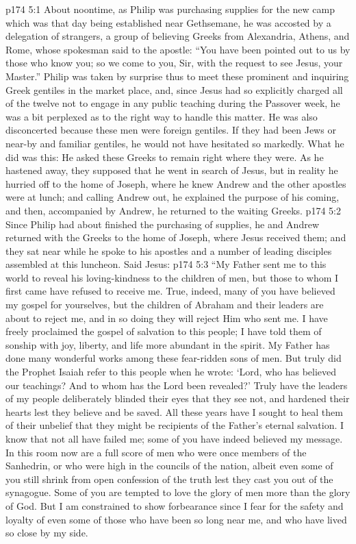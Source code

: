 \vs p174 5:1 About noontime, as Philip was purchasing supplies for the new camp which was that day being established near Gethsemane, he was accosted by a delegation of strangers, a group of believing Greeks from Alexandria, Athens, and Rome, whose spokesman said to the apostle: “You have been pointed out to us by those who know you; so we come to you, Sir, with the request to see Jesus, your Master.” Philip was taken by surprise thus to meet these prominent and inquiring Greek gentiles in the market place, and, since Jesus had so explicitly charged all of the twelve not to engage in any public teaching during the Passover week, he was a bit perplexed as to the right way to handle this matter. He was also disconcerted because these men were foreign gentiles. If they had been Jews or near\hyp{}by and familiar gentiles, he would not have hesitated so markedly. What he did was this: He asked these Greeks to remain right where they were. As he hastened away, they supposed that he went in search of Jesus, but in reality he hurried off to the home of Joseph, where he knew Andrew and the other apostles were at lunch; and calling Andrew out, he explained the purpose of his coming, and then, accompanied by Andrew, he returned to the waiting Greeks.
\vs p174 5:2 Since Philip had about finished the purchasing of supplies, he and Andrew returned with the Greeks to the home of Joseph, where Jesus received them; and they sat near while he spoke to his apostles and a number of leading disciples assembled at this luncheon. Said Jesus:
\pc \vs p174 5:3 \textcolor{ubdarkred}{“My Father sent me to this world to reveal his loving\hyp{}kindness to the children of men, but those to whom I first came have refused to receive me. True, indeed, many of you have believed my gospel for yourselves, but the children of Abraham and their leaders are about to reject me, and in so doing they will reject Him who sent me. I have freely proclaimed the gospel of salvation to this people; I have told them of sonship with joy, liberty, and life more abundant in the spirit. My Father has done many wonderful works among these fear\hyp{}ridden sons of men. But truly did the Prophet Isaiah refer to this people when he wrote: ‘Lord, who has believed our teachings? And to whom has the Lord been revealed?’ Truly have the leaders of my people deliberately blinded their eyes that they see not, and hardened their hearts lest they believe and be saved. All these years have I sought to heal them of their unbelief that they might be recipients of the Father’s eternal salvation. I know that not all have failed me; some of you have indeed believed my message. In this room now are a full score of men who were once members of the Sanhedrin, or who were high in the councils of the nation, albeit even some of you still shrink from open confession of the truth lest they cast you out of the synagogue. Some of you are tempted to love the glory of men more than the glory of God. But I am constrained to show forbearance since I fear for the safety and loyalty of even some of those who have been so long near me, and who have lived so close by my side.}
